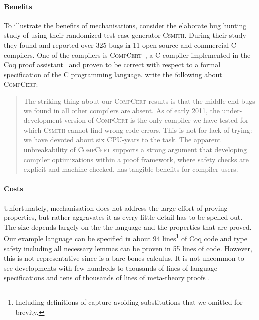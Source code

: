 {\paragraph{Benefits}
To illustrate the benefits of mechanisations, consider the elaborate bug hunting
study of \citet{yang2011bugs} using their randomized test-case generator
\textsc{Csmith}.  During their study they found and reported over 325 bugs in 11
open source and commercial C compilers. One of the compilers is
\textsc{CompCert}~\cite{Leroy2009}, a C compiler implemented in the Coq proof
assistant~\cite{coq} and proven to be correct with respect to a formal
specification of the C programming language. \citet{yang2011bugs} write the
following about \textsc{CompCert}:


\blockquote{The striking thing about our \textsc{CompCert} results is that the
  middle-end bugs we found in all other compilers are absent. As of early 2011,
  the under-development version of \textsc{CompCert} is the only compiler we
  have tested for which \textsc{Csmith} cannot find wrong-code errors. This is
  not for lack of trying: we have devoted about six CPU-years to the task. The
  apparent unbreakability of \textsc{CompCert} supports a strong argument that
  developing compiler optimizations within a proof framework, where safety
  checks are explicit and machine-checked, has tangible benefits for compiler
  users.}


\paragraph{Costs}
Unfortunately, mechanisation does not address the large effort of proving
properties, but rather aggravates it as every little detail has to be spelled
out. The size depends largely on the the language and the properties that are
proved. Our example language \stlcbool can be specified in about 94
lines\footnote{Including definitions of capture-avoiding substitutions that we
  omitted for brevity.} of Coq code and type safety including all necessary
lemmas can be proven in 55 lines of code. However, this is not representative
since \stlcbool is a bare-bones calculus. It is not uncommon to see developments
with few hundreds to thousands of lines of language specifications and tens of
thousands of lines of meta-theory proofs \cite{Leroy2009, Zhao2010}.


}
